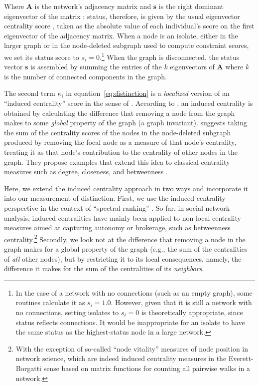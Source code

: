 \documentclass[12pt]{article}
\begin{document}
Where $\mathbf{A}$ is the network's adjacency matrix and $\mathbf{s}$ is the right dominant eigenvector of the matrix \citep{vigna2016spectral-19a}; status, therefore, is given by the usual eigenvector centrality score \citep{bonacich1972factoring-03e}, taken as the absolute value of each individual's score on the first eigenvector of the adjacency matrix. When a node is an isolate, either in the larger graph or in the node-deleted subgraph used to compute constraint scores, we set its status score to $s_i =0$.\footnote{In the case of a network with no connections (such as an empty graph), some routines calculate it as $s_i =1.0$. However, given that it is still a network with no connections, setting isolates to $s_i = 0$ is theoretically appropriate, since status reflects connections. It would be inappropriate for an isolate to have the same status as the highest-status node in a large network.} When the graph is disconnected, the status vector $\mathbf{s}$ is assembled by summing the entries of the $k$ eigenvectors of $\mathbf{A}$ where $k$ is the number of connected components in the graph.

The second term $\kappa_i$ in equation~\ref{eq:distinction} is a \textit{localized} version of an ``induced centrality'' score in the sense of \citet{borgatti2020oxford-fa6}. According to \citet{everett2010induced-817}, an induced centrality is obtained by calculating the difference that removing a node from the graph makes to some \textit{global} property of the graph (a graph invariant). \citet{everett2010induced-817} suggests taking the sum of the centrality scores of the nodes in the node-deleted subgraph produced by removing the focal node as a measure of that node's centrality, treating it as that node's contribution to the centrality of other nodes in the graph. They propose examples that extend this idea to classical centrality measures such as degree, closeness, and betweenness \citep{freeman79}. 

Here, we extend the induced centrality approach in two ways and incorporate it into our measurement of distinction. First, we use the induced centrality perspective in the context of ``spectral ranking'' \citep{vigna2016spectral-19a}. So far, in social network analysis, induced centralities have mainly been applied to non-local centrality measures aimed at capturing autonomy or brokerage, such as betweenness centrality.\footnote{With the exception of so-called ``node vitality'' measures of node position in network science, which are indeed induced centrality measures in the Everett-Borgatti sense based on matrix functions for counting all pairwise walks in a network.} Secondly, we look not at the difference that removing a node in the graph makes for a global property of the graph (e.g., the sum of the centralities of \textit{all} other nodes), but by restricting it to its local consequences, namely, the difference it makes for the sum of the centralities of its \textit{neighbors}.  
\end{document}
